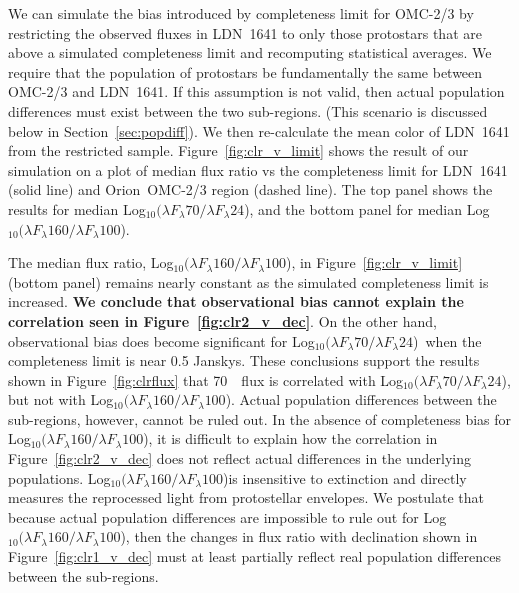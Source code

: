 \documentclass[manuscript]{aastex}
\newcommand{\clra}{Log$_{10}(\lambda F_\lambda70/\lambda F_\lambda24$)}
\newcommand{\clrb}{Log$_{10}(\lambda F_\lambda160/\lambda F_\lambda100$)}
\begin{document}
\par
We can simulate the bias introduced by completeness limit for OMC-2/3 by restricting the observed fluxes in LDN~1641 to only those protostars that are above a simulated completeness limit and recomputing statistical averages. We require that the population of protostars be fundamentally the same between OMC-2/3 and LDN~1641. If this assumption is not valid, then actual population differences must exist between the two sub-regions. (This scenario is discussed below in Section~\ref{sec:popdiff}).  We then re-calculate the mean color of LDN~1641 from the restricted sample. Figure~\ref{fig:clr_v_limit} shows the result of our simulation on a plot of median flux ratio vs the completeness limit for LDN~1641 (solid line) and Orion~OMC-2/3 region (dashed line). The top panel shows the results for median \clra, and the bottom panel for median \clrb.
\par
The median flux ratio, \clrb, in Figure~\ref{fig:clr_v_limit} (bottom panel) remains nearly constant as the simulated completeness limit is increased. {\bf We conclude that observational bias cannot explain the correlation seen in Figure~\ref{fig:clr2_v_dec}}. On the other hand, observational bias does become significant for \clra\ when the completeness limit is near 0.5 Janskys. These conclusions support the results shown in Figure~\ref{fig:clrflux} that 70~\micron\ flux is correlated with \clra, but not with \clrb.  Actual population differences between the sub-regions, however, cannot be ruled out. In the absence of completeness bias for \clrb, it is difficult to explain how the correlation in Figure~\ref{fig:clr2_v_dec} does not reflect actual differences in the underlying populations. \clrb is insensitive to extinction and directly measures the reprocessed light from protostellar envelopes.  We postulate that because actual population differences are impossible to rule out for \clrb, then the changes in flux ratio with declination shown in Figure~\ref{fig:clr1_v_dec} must at least partially reflect real population differences between the sub-regions.
\end{document}
